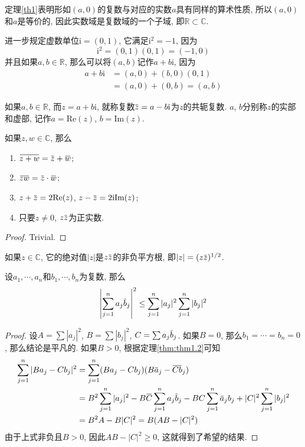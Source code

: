 \documentclass[cn,12pt,math=mtpro2,citestyle=gb7714-2015,bibstyle=gb7714-2015,twocol]{elegantbook}
\newcommand{\R}{\mathbb{R}}
\newcommand{\C}{\mathbb{C}}
\newcommand{\overbar}[1]{\mkern 1.5mu\overline{\mkern-1.5mu#1\mkern-1.5mu}\mkern 1.5mu}
\begin{document}
定理\ref{th1}表明形如$(a,0)$的复数与对应的实数$a$具有同样的算术性质, 所以$(a,0)$和$a$是等价的, 因此实数域是复数域的一个子域, 即$\R \subset \C$.

进一步规定虚数单位$\text{i}=(0,1)$, 它满足$\text{i}^2=-1$, 因为
$$\text{i}^2=(0,1)(0,1)=(-1,0)$$
并且如果$a, b \in \R$, 那么可以将$(a,b)$记作$a+b\text{i}$, 因为
\begin{align*}
a+b\text{i}&=(a,0)+(b,0)(0,1) \\
&=(a,0)+(0,b)=(a,b)
\end{align*}

\begin{definition}
如果$a,b\in \R$, 而$z=a+b\text{i}$, 就称复数$\overbar{z}=a-b\text{i}$为$z$的共轭复数. $a$, $b$分别称$z$的实部和虚部, 记作$a=\text{Re}(z)$, $b=\text{Im}(z)$.
\end{definition}
\begin{theorem}\label{thm:thm1.2}
  如果$z, w \in \C$, 那么
  \begin{enumerate}[label=(\arabic*)]
  \item $\overbar{z+w}=\overbar{z}+\overbar{w}$;
  \item $\overbar{zw}=\overbar{z}\cdot\overbar{w}$;
  \item $z+\overbar{z}=2\text{Re}(z)$, $z-\overbar{z}=2\text{i}\text{Im}(z)$;
  \item 只要$z\neq 0$, $z\overbar{z}$为正实数.
  \end{enumerate}
\end{theorem}
\begin{proof}
  Trivial.
\end{proof}

\begin{definition}
如果$z\in\C$, 它的绝对值$|z|$是$z\overbar{z}$的非负平方根, 即$|z|=(z\overbar{z})^{1/2}$.
\end{definition}

\begin{theorem}
  设$a_1,\cdots,a_n$和$b_1,\cdots,b_n$为复数, 那么
  $$\left|\sum_{j=1}^{n}a_j\overbar{b}_j\right|^2\leq\sum_{j=1}^{n}|a_j|^2\sum_{j=1}^{n}|b_j|^2$$
\end{theorem}
\begin{proof}
  设$A=\sum|a_j|^2$, $B=\sum|b_j|^2$, $C=\sum a_j\overbar{b}_j$. 如果$B=0$, 那么$b_1=\cdots=b_n=0$, 那么结论是平凡的. 如果$B>0$, 根据定理\ref{thm:thm1.2}可知
  \begin{align*}
  \sum_{j=1}^{n}|Ba_j-Cb_j|^2&=\sum_{j=1}^{n}(Ba_j-Cb_j)(B\overbar{a}_j-\overbar{Cb}_j) \\
  &=B^2\sum_{j=1}^{n}|a_j|^2-B\overbar{C}\sum_{j=1}^{n}a_j\overbar{b}_j-BC\sum_{j=1}^{n}\overbar{a}_jb_j+|C|^2\sum_{j=1}^{n}|b_j|^2 \\
  &=B^2A-B|C|^2=B(AB-|C|^2)
  \end{align*}
  由于上式非负且$B>0$, 因此$AB-|C|^2\ge0$, 这就得到了希望的结果.
\end{proof}
\end{document}
